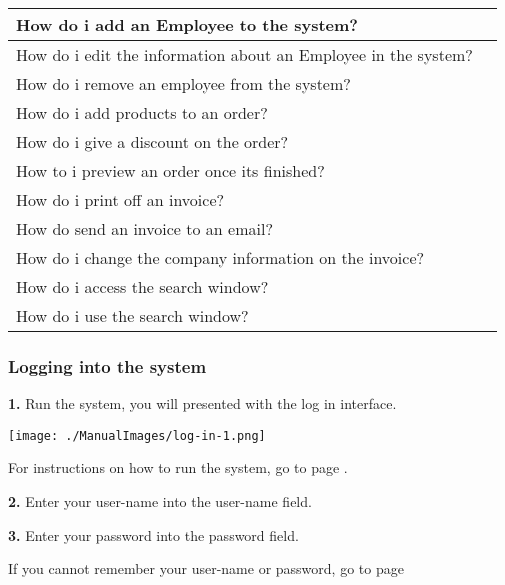 \begin{center}
\begin{longtable}{|p{8cm}|p{3cm}|}
	How do i add an Employee to the system?&  \pageref{fig:Adding an Employee to the system} \\ \hline
	How do i edit the information about an Employee in the system?&  \pageref{fig:Editing an Employee in the system} \\ \hline
	How do i remove an employee from the system?&  \pageref{fig:Removing an Employee for the system.} \\ \hline
	How do i add products to an order?&  \pageref{fig:Adding products to an order} \\ \hline
	How do i give a discount on the order? &  \pageref{fig:Applying a Discount to an Order} \\ \hline
	How to i preview an order once its finished?&  \pageref{fig:Previewing the invoice} \\ \hline
	How do i print off an invoice?&  \pageref{fig:Printing an invoice} \\ \hline
	How do send an invoice to an email?&  \pageref{fig:Emailing an invoice} \\ \hline
	How do i change the company information on the invoice? &  \pageref{fig:Changing information on the invoice} \\ \hline
	How do i access the search window?&  \pageref{fig:Accessing the search window} \\ \hline
	How do i use the search window?&  \pageref{fig:Using the search window} \\ \hline
	\end{longtable}
\end{center}
\pagebreak

\subsubsection{Logging into the system}
\label{fig:Logging into the system}

\textbf{1.} Run the system, you will presented with the log in interface.
 
\texttt{[image: ./ManualImages/log-in-1.png]}
  
For instructions on how to run the system, go to page \pageref{fig:Running the System}.

\textbf{2.} Enter your user-name into the user-name field.

\textbf{3.} Enter your password into the password field.

If you cannot remember your user-name or password, go to page \pageref{fig:Forgetting Your User-name or Password}

